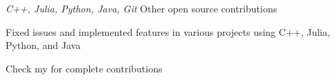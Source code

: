 \begin{cventries}
  \cventry
    {\emph{C++, Julia, Python, Java, Git}} %
    {Other open source contributions} %
    {} %
    {} %
    {
      \begin{cvitems} %
        \item{Fixed issues and implemented features in various projects using C++, Julia, Python, and Java}
        \item{Check my \href{https://github.com/pulls?q=is\%3Apr+archived\%3Afalse+is\%3Aclosed+author\%3AAdriankhl}{\underline{}} for complete contributions}
      \end{cvitems}
    }


\end{cventries}
